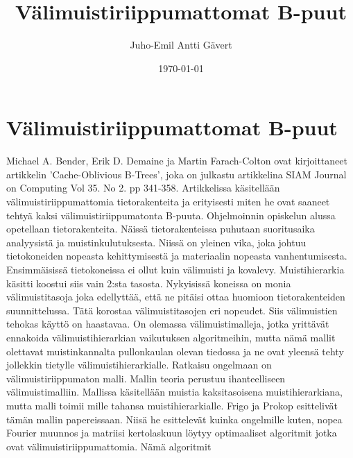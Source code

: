 \documentclass[finnish]{tktltiki2}
\title{Välimuistiriippumattomat B-puut}
\author{Juho-Emil Antti Gävert}
\date{\today}
\theoremstyle{definition}
\theoremstyle{remark}
\begin{document}

\maketitle        %
\makeabstract     %

\newpage          %



\section*{Välimuistiriippumattomat B-puut}


Michael A. Bender, Erik D. Demaine ja Martin Farach-Colton ovat kirjoittaneet
artikkelin 'Cache-Oblivious B-Trees', joka on julkastu artikkelina SIAM Journal
on Computing Vol 35. No 2. pp 341-358. Artikkelissa käsitellään
välimuistiriippumattomia tietorakenteita ja erityisesti miten he ovat saaneet
tehtyä kaksi välimuistiriippumatonta B-puuta.
\newline \indent Ohjelmoinnin opiskelun alussa opetellaan tietorakenteita.
Näissä tietorakenteissa puhutaan suoritusaika analyysistä ja
muistinkulutuksesta. Niissä on yleinen vika, joka johtuu tietokoneiden nopeasta
kehittymisestä ja materiaalin nopeasta vanhentumisesta. Ensimmäisissä
tietokoneissa ei ollut kuin välimuisti ja kovalevy. Muistihierarkia käsitti
koostui siis vain 2:sta tasosta. Nykyisissä koneissa on monia välimuistitasoja
joka edellyttää, että ne pitäisi ottaa huomioon tietorakenteiden
suunnittelussa. Tätä korostaa välimuistitasojen eri nopeudet. Siis välimuistien
tehokas käyttö on haastavaa. On olemassa välimuistimalleja, jotka yrittävät
ennakoida välimuistihierarkian vaikutuksen algoritmeihin, mutta nämä mallit
olettavat muistinkannalta pullonkaulan olevan tiedossa ja ne ovat yleensä tehty
jollekkin tietylle välimuistihierarkialle.
\newline \indent Ratkaisu ongelmaan on välimuistiriippumaton malli. Mallin teoria perustuu
ihanteelliseen välimuistimalliin. Mallissa käsitellään muistia kaksitasoisena
muistihierarkiana, mutta malli toimii mille tahansa muistihierarkialle. Frigo
ja Prokop esittelivät tämän mallin papereissaan. Niisä he esittelevät kuinka
ongelmille kuten, nopea Fourier muunnos ja matriisi kertolaskuun löytyy
optimaaliset algoritmit jotka ovat välimuistiriippumattomia. Nämä algoritmit
\end{document}
